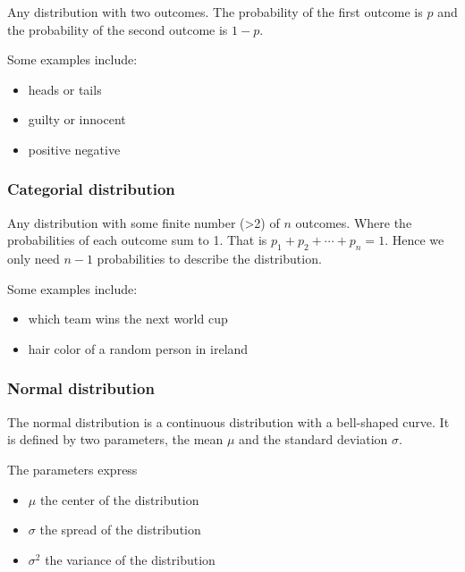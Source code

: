 \documentclass[12pt]{article}
\begin{document}
\begin{definition}
    Any distribution with two outcomes. The probability of the first outcome is $p$ and the probability of the second outcome is $1 - p$. 
\end{definition}

Some examples include: 
\begin{itemize}[leftmargin=*, noitemsep]
    \item heads or tails
    \item guilty or innocent 
    \item positive negative
\end{itemize}

\subsubsection*{Categorial distribution}

\begin{definition}
    Any distribution with some finite number (>2) of $n$ outcomes. Where the probabilities of each outcome sum to 1. That is $p_1 + p_2 + \cdots + p_n = 1$. Hence we only need $n - 1$ probabilities to describe the distribution.
\end{definition}

Some examples include:
\begin{itemize}[leftmargin=*, noitemsep]
    \item which team wins the next world cup 
    \item hair color of a random person in ireland  
\end{itemize}

\subsubsection*{Normal distribution}

\begin{definition}
    The normal distribution is a continuous distribution with a bell-shaped curve. It is defined by two parameters, the mean $\mu$ and the standard deviation $\sigma$.   
\end{definition}

The parameters express 
\begin{itemize}[leftmargin=*, noitemsep]
    \item $\mu$ the center of the distribution
    \item $\sigma$ the spread of the distribution
    \item $\sigma^2$ the variance of the distribution
\end{itemize}
\end{document}
